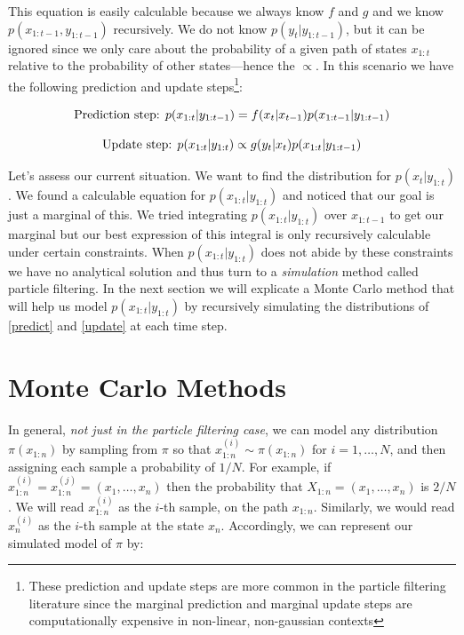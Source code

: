 \documentclass{article}
\begin{document}
\noindent
This equation is easily calculable because we always know $f$ and $g$ and we know $p(x_{1:t-1},y_{1:t-1})$ recursively. We do not know $p(y_t|y_{1:t-1})$, but it can be ignored since we only care about the probability of a given path of states $x_{1:t}$ relative to the probability of other states---hence the $\propto$. In this scenario we have the following prediction and update steps\footnote{These prediction and update steps are more common in the particle filtering literature since the marginal prediction and marginal update steps are computationally expensive in non-linear, non-gaussian contexts}:

\begin{equation} \label{predict}
\textnormal{Prediction step:  }
p(x_{1:t}|y_{1:t-1})= f(x_t|x_{t-1}) p(x_{1:t-1}|y_{1:t-1})
\end{equation}

\begin{equation} \label{update}
\textnormal{Update step:  }
p(x_{1:t}|y_{1:t})\propto g(y_t|x_t)p(x_{1:t}|y_{1:t-1})
\end{equation}

Let's assess our current situation. We want to find the distribution for $p(x_t|y_{1:t})$. We found a calculable equation for $p(x_{1:t}|y_{1:t})$ and noticed that our goal is just a marginal of this. We tried integrating $p(x_{1:t}|y_{1:t})$ over $x_{1:t-1}$ to get our marginal but our best expression of this integral is only recursively calculable under certain constraints. When $p(x_{1:t}|y_{1:t})$ does not abide by these constraints we have no analytical solution and thus turn to a \textit{simulation} method called particle filtering. In the next section we will explicate a Monte Carlo method that will help us model $p(x_{1:t}|y_{1:t})$ by recursively simulating the distributions of \eqref{predict} and \eqref{update} at each time step.

\section{Monte Carlo Methods}

In general, \textit{not just in the particle filtering case}, we can model any distribution $\pi(x_{1:n})$ by sampling from $\pi$ so that $x_{1:n}^{(i)} \sim \pi(x_{1:n})$ for $i=1,\dots,N$, and then assigning each sample a probability of $1/N$. For example, if $x_{1:n}^{(i)} = x_{1:n}^{(j)} = (x_1,\dots,x_n)$ then the probability that $X_{1:n} = (x_1,\dots,x_n)$ is $2/N$. We will read $x_{1:n}^{(i)}$ as the $i$-th sample, on the path $x_{1:n}$. Similarly, we would read $x_{n}^{(i)}$ as the $i$-th sample at the state $x_{n}$. Accordingly, we can represent our simulated model of $\pi$ by:
\end{document}
